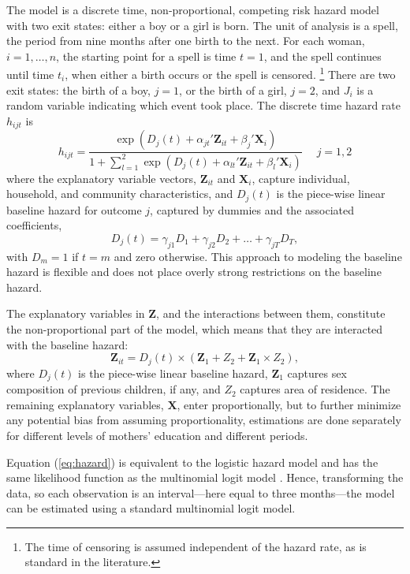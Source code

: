 \documentclass[12pt,letterpaper]{article}
\begin{document}
The model is a discrete time, non-proportional, competing risk hazard model with two exit 
states: either a boy or a girl is born.
The unit of analysis is a spell, the period from nine months after one birth to the next.
For each woman, $i=1,\ldots,n$, the starting point for a spell is time $t=1$, and 
the spell continues until time $t_i$, when either a birth occurs or the spell 
is censored.%
\footnote{
The time of censoring is assumed independent of the hazard rate,
as is standard in the literature.
}
There are two exit states: the birth of a boy, $j=1$, or the birth of a girl, $j=2$, and 
$J_i$ is a random variable indicating which event took place.
The discrete time hazard rate $h_{ijt}$ is 
\begin{equation}
 h_{ijt} = \frac{\exp(D_j(t) + \alpha_{jt}'\mathbf{Z}_{it} + \beta_j'\mathbf{X}_{i})} 
 {1 + \sum_{l=1}^2 \exp(D_j(t) + \alpha_{lt}'\mathbf{Z}_{it} + \beta_l'\mathbf{X}_{i})} \: \: \; \; \;  j = 1,2
 \label{eq:hazard}
\end{equation}
where the explanatory variable vectors, $\mathbf{Z}_{it}$ and $\mathbf{X}_{i}$, capture 
individual, household, and community characteristics,
and $D_{j}(t)$ is the piece-wise linear baseline hazard for outcome $j$, captured
by dummies and the associated coefficients,
\begin{equation}
D_j(t) = \gamma_{j1} D_1 + \gamma_{j2} D_2 + \ldots + \gamma_{jT} D_T,
\end{equation}
with $D_m = 1$ if $t=m$ and zero otherwise.
This approach to modeling the baseline hazard is flexible and does not place 
overly strong restrictions on the baseline hazard.

The explanatory variables in $\mathbf{Z}$, and the interactions between them, 
constitute the non-proportional part of the model, which means that they are
interacted with the baseline hazard:
\begin{equation}
 \mathbf{Z}_{it} = D_j(t) \times (\mathbf{Z}_1 + Z_2 + \mathbf{Z}_1 \times Z_2),
\end{equation}
where $D_j(t)$ is the piece-wise linear baseline hazard, $\mathbf{Z}_1$ captures sex 
composition of previous children, if any, and $Z_2$ captures area of residence.
The remaining explanatory variables, $\mathbf{X}$, enter proportionally,
but to further minimize any potential bias from assuming proportionality, estimations 
are done separately for different levels of mothers' education and different 
periods.

Equation (\ref{eq:hazard}) is equivalent to the logistic hazard model and has the same 
likelihood function as the multinomial logit model \citep{allison82,jenkins95}.
Hence, transforming the data, so each observation is an interval---here equal
to three months---the model can be estimated using a standard multinomial logit model.
\end{document}
